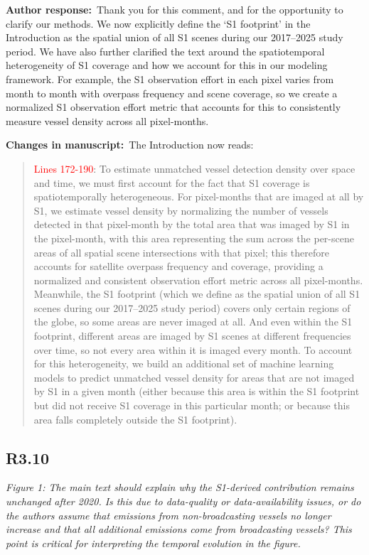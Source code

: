 \documentclass[11pt]{article}
\newcommand{\point}[1]{\subsection*{\normalfont\bfseries #1}}
\newcommand{\response}{\par\medskip\noindent%
  \textbf{\textcolor{respblue}{Author response:}}\ }
\newcommand{\changes}{\par\medskip\noindent%
  \textbf{\textcolor{changegreen}{Changes in manuscript:}}\ }
\begin{document}
\response Thank you for this comment, and for the opportunity to clarify our methods. We now explicitly define the `S1 footprint' in the Introduction as the spatial union of all S1 scenes during our 2017--2025 study period. We have also further clarified the text around the spatiotemporal heterogeneity of S1 coverage and how we account for this in our modeling framework. For example, the S1 observation effort in each pixel varies from month to month with overpass frequency and scene coverage, so we create a normalized S1 observation effort metric that accounts for this to consistently measure vessel density across all pixel-months.

\changes The Introduction now reads:

\begin{quote}
 \textcolor{red}{Lines 172-190}: To estimate unmatched vessel detection density over space and time, we must first account for the fact that S1 coverage is spatiotemporally heterogeneous. For pixel-months that are imaged at all by S1, we estimate vessel density by normalizing the number of vessels detected in that pixel-month by the total area that was imaged by S1 in the pixel-month, with this area representing the sum across the per-scene areas of all spatial scene intersections with that pixel; this therefore accounts for satellite overpass frequency and coverage, providing a normalized and consistent observation effort metric across all pixel-months. Meanwhile, the S1 footprint (which we define as the spatial union of all S1 scenes during our 2017--2025 study period) covers only certain regions of the globe, so some areas are never imaged at all. And even within the S1 footprint, different areas are imaged by S1 scenes at different frequencies over time, so not every area within it is imaged every month. To account for this heterogeneity, we build an additional set of machine learning models to predict unmatched vessel density for areas that are not imaged by S1 in a given month (either because this area is within the S1 footprint but did not receive S1 coverage in this particular month; or because this area falls completely outside the S1 footprint).
\end{quote}

\point{R3.10}

\begin{refquote}\itshape
Figure 1: The main text should explain why the S1-derived contribution remains
unchanged after 2020. Is this due to data-quality or data-availability issues,
or do the authors assume that emissions from non-broadcasting vessels no longer
increase and that all additional emissions come from broadcasting vessels? This
point is critical for interpreting the temporal evolution in the figure.
\end{refquote}
\end{document}
